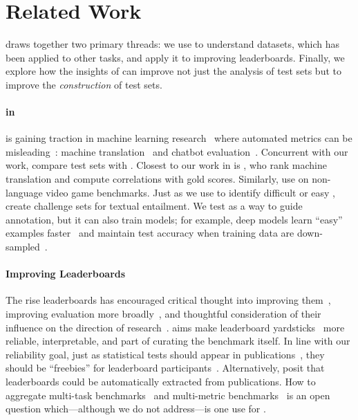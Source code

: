 \section{Related Work}
\label{ch:isicle:rel}

\name{} draws together two primary threads: we use \irt{} to
understand datasets, which has been applied to other  tasks,
and apply it to improving leaderboards.
%
%
Finally, we explore how the insights of \irt{} can improve not just
the analysis of test sets but to improve the \emph{construction} of
test sets.

\paragraph{\textbf{ in }}
\irt{} is gaining traction in machine learning
research~\citep{martinez2016ml,martinez2019irt} where automated metrics can be
misleading~\citep{sedoc2019chateval}: machine
translation~\citep{hopkins2013competitions} and chatbot
evaluation~\citep{sedoc2020irt}.
%
Concurrent with our work, \citet{vania2021compare} compare \nlp{} test sets with \irt{}.
Closest to our work in \nlp{} is \citet{otani2016aggregation}, who
rank machine translation \subjs{} and compute correlations with gold
scores.  Similarly, \citet{martinez2020indicators} use \irt{} on
non-language  video game benchmarks.
%
Just as we use \irt{} to identify difficult or easy \itms{},
\citet{lalor2016irt} create challenge sets for textual entailment.
%
We
test \irt{} as a way to guide annotation, but it can also
train \nlp{} models; for example, deep models learn ``easy'' examples
faster~\citep{lalor2018diff} and maintain test accuracy when training
data are down-sampled~\citep{lalor2019latent}.

\paragraph{\textbf{Improving Leaderboards}}
%
The rise \nlp{} leaderboards has encouraged critical thought into
improving them~\citep{linzen2020progress}, improving evaluation more
broadly~\citep{eger2020workshop}, and thoughtful consideration of
their influence on the direction of
research~\citep{sculley2018curse,dotan2020value}.
%
\name{} aims make leaderboard
yardsticks~\citep{hernandez2020yardsticks} more reliable,
interpretable, and part of curating the benchmark itself.
%
In line
with our reliability goal, just as statistical tests should appear in
publications~\citep{dror2018guide,Dodge2019ShowYW}, they should be
``freebies'' for leaderboard
participants~\citep{ethayarajh2020utility}.  Alternatively,
\citet{hou2019leader} posit that leaderboards could be automatically
extracted from publications.
%
How to aggregate multi-task
benchmarks~\citep{wang2018glue,wang2019superglue,fisch2019mrqa} and multi-metric benchmarks~\citep{ma2021dynaboard} is an
open question which---although we do not address---is one use for
\irt{}.



